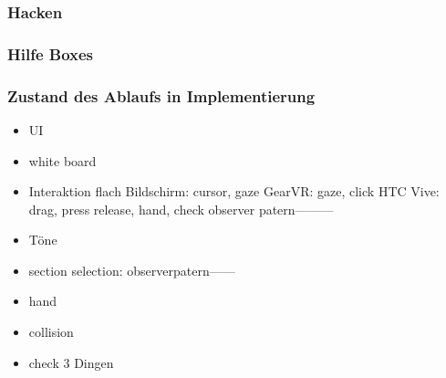   \subsubsection{Hacken}
  
  \subsubsection{Hilfe Boxes}
  
  \subsubsection{Zustand des Ablaufs in Implementierung}
  
\begin{itemize}
\item UI
\item white board
\item Interaktion
\subitem flach Bildschirm: cursor, gaze
\subitem GearVR: gaze, click
\subitem HTC Vive: drag, press release, hand, check
\subitem observer patern---------
\item Töne
\item section selection: observerpatern------
\item hand
\item collision
\item check 3 Dingen
\end{itemize}
